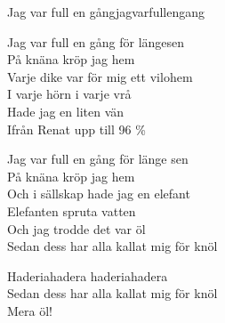 \begin{song}{Jag var full en gång}{jagvarfullengang}
\begin{vers}
Jag var full en gång för längesen\\
På knäna kröp jag hem\\
Varje dike var för mig ett vilohem\\
I varje hörn i varje vrå\\
Hade jag en liten vän\\
Ifrån Renat upp till 96 \% \\
\end{vers}
\begin{vers}
Jag var full en gång för länge sen\\
På knäna kröp jag hem\\
Och i sällskap hade jag en elefant\\
Elefanten spruta vatten\\
Och jag trodde det var öl\\
Sedan dess har alla kallat mig för knöl\\
\end{vers}
\begin{vers}
Haderiahadera haderiahadera\\
Sedan dess har alla kallat mig för knöl\\
Mera öl!\\
\end{vers}
\end{song}
